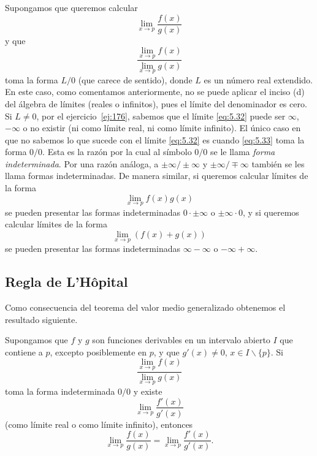 \documentclass[12pt,a4paper]{book}
\begin{document}
    Supongamos que queremos calcular
    \begin{equation}\label{eq:5.32}
        \lim_{x\to p}\frac{f(x)}{g(x)}
    \end{equation}
    y que
    \begin{equation}\label{eq:5.33}
        \frac{\lim_{x\to p}f(x)}{\lim_{x\to p}g(x)}
    \end{equation}
    toma la forma $L/0$ (que carece de sentido), donde $L$ es un número real extendido.
    En este caso, como comentamos anteriormente, no se puede aplicar
    el inciso (d) del álgebra de límites (reales o infinitos), pues el límite del denominador
    es cero. Si $L\neq 0$, por el ejercicio~\ref{ej:176}, sabemos que el límite \eqref{eq:5.32}
    puede ser $\infty$, $-\infty$ o no existir (ni como límite real, ni como límite infinito).
    El único caso en que no sabemos lo que sucede con el límite \eqref{eq:5.32} es cuando
    \eqref{eq:5.33} toma la forma $0/0$. Esta es la razón por la cual al símbolo $0/0$ se le
    llama \textit{forma indeterminada}. Por una razón análoga, a $\pm\infty/\pm\infty$ y $\pm\infty/\mp\infty$
    también se les llama formas indeterminadas. De manera similar, si queremos
    calcular límites de la forma
    \begin{equation*}
        \lim_{x\to p}f(x)g(x)
    \end{equation*}
    se pueden presentar las formas indeterminadas $0\cdot\pm\infty$ o $\pm\infty\cdot 0$, y si queremos
    calcular límites de la forma
    \begin{equation*}
        \lim_{x\to p}(f(x)+g(x))
    \end{equation*}
    se pueden presentar las formas indeterminadas $\infty-\infty$ o $-\infty+\infty$.

    \subsection{Regla de L'Hôpital}

    Como consecuencia del teorema del valor medio generalizado obtenemos
    el resultado siguiente.

    \begin{proposicion}\label{prop:67}
        Supongamos que $f$ y $g$ son funciones
        derivables en un intervalo abierto $I$ que contiene a $p$, excepto posiblemente
        en $p$, y que $g'(x)\neq 0$, $x\in I\backslash\{p\}$. Si
        \begin{equation}\label{eq:5.34}
            \frac{\lim_{x\to p}f(x)}{\lim_{x\to p}g(x)}
        \end{equation}
        toma la forma indeterminada $0/0$ y existe
        \begin{equation}\label{eq:5.35}
            \lim_{x\to p}\frac{f'(x)}{g'(x)}
        \end{equation}
        (como límite real o como límite infinito), entonces
        \begin{equation*}
            \lim_{x\to p}\frac{f(x)}{g(x)}=\lim_{x\to p}\frac{f'(x)}{g'(x)}.
        \end{equation*}
    \end{proposicion}
\end{document}

